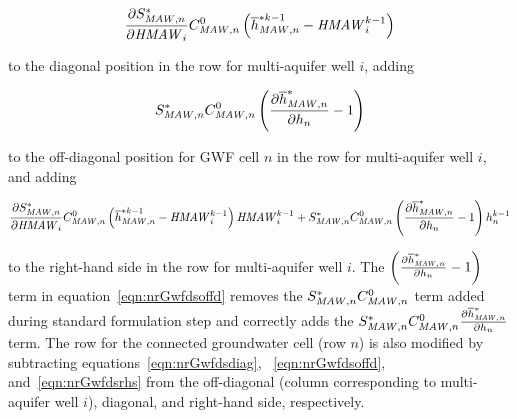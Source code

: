 \begin{equation}
	\label{eqn:nrGwfdsdiag}
	\frac{\partial S_{\mathit{MAW},n}^*}{\partial \mathit{HMAW}_i} C_{\mathit{MAW},n}^0 \left( \overline{h}_{\mathit{MAW},n}^{*k-1} - \mathit{HMAW}_{i}^{k-1} \right)
\end{equation}

\noindent to the diagonal position in the row for multi-aquifer well $i$, adding

\begin{equation}
	\label{eqn:nrGwfdsoffd}
	S_{\mathit{MAW},n}^* C_{\mathit{MAW},n}^0 \left( \frac{\partial \overline{h}^*_{\mathit{MAW},n}}{\partial h_n} - 1\right)
\end{equation}

\noindent to the off-diagonal position for GWF cell $n$ in the row for multi-aquifer well $i$, and adding

\begin{equation}
	\label{eqn:nrGwfdsrhs}
	\frac{\partial S_{\mathit{MAW},n}^*}{\partial \mathit{HMAW}_i} C_{\mathit{MAW},n}^0 \left( \overline{h}_{\mathit{MAW},n}^{*k-1} - \mathit{HMAW}_{i}^{k-1} \right) \mathit{HMAW}_i^{k-1} + S_{\mathit{MAW},n}^* C_{\mathit{MAW},n}^0 \left( \frac{\partial \overline{h}^*_{\mathit{MAW},n}}{\partial h_n} - 1 \right) h^{k-1}_n
\end{equation}

\noindent to the right-hand side in the row for multi-aquifer well $i$. The $\left( \frac{\partial \overline{h}^*_{\mathit{MAW},n}}{\partial h_n} - 1 \right)$ term in equation~\ref{eqn:nrGwfdsoffd} removes the $S_{\mathit{MAW},n}^* C_{\mathit{MAW},n}^0$ term added during standard formulation step and correctly adds the $S_{\mathit{MAW},n}^* C_{\mathit{MAW},n}^0 \frac{\partial \overline{h}^*_{\mathit{MAW},n}}{{\partial h_n}}$ term. The row for the connected groundwater cell (row $n$) is also modified by subtracting equations~\ref{eqn:nrGwfdsdiag}, ~\ref{eqn:nrGwfdsoffd}, and~\ref{eqn:nrGwfdsrhs} from the off-diagonal (column corresponding to multi-aquifer well $i$), diagonal, and right-hand side, respectively.